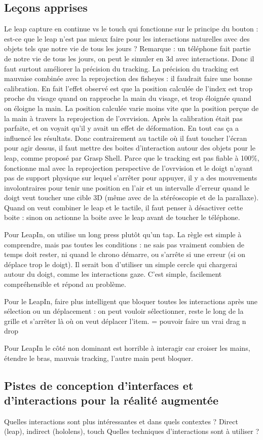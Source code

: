 \subsection{Leçons apprises}
Le leap capture en continue vs le touch qui fonctionne sur le principe du bouton : est-ce que le leap n'est pas mieux faire pour les interactions naturelles avec des objets tels que notre vie de tous les jours ? Remarque : un téléphone fait partie de notre vie de tous les jours, on peut le simuler en 3d avec interactions. Donc il faut surtout améliorer la précision du tracking.
La précision du tracking est mauvaise combinée avec la reprojection des fisheyes : il faudrait faire une bonne calibration. En fait l'effet observé est que la position calculée de l'index est trop proche du visage quand on rapproche la main du visage, et trop éloignée quand on éloigne la main. La position calculée varie moins vite que la position perçue de la main à travers la reprojection de l'ovrvision. Après la calibration était pas parfaite, et on voyait qu'il y avait un effet de déformation. En tout cas ça a influencé les résultats.
Donc contrairement au tactile où il faut toucher l'écran pour agir dessus, il faut mettre des boites d'interaction autour des objets pour le leap, comme proposé par Grasp Shell. Parce que le tracking est pas fiable à 100\%, fonctionne mal avec la reprojection perspective de l'ovrvision et le doigt n'ayant pas de support physique sur lequel s'arrêter pour appuyer, il y a des mouvements involontraires pour tenir une position en l'air et un intervalle d'erreur quand le doigt veut toucher une cible 3D (même avec de la stéréoscopie et de la parallaxe).
Quand on veut combiner le leap et le tactile, il faut penser à désactiver cette boite : sinon on actionne la boite avec le leap avant de toucher le téléphone.

Pour LeapIn, on utilise un long press plutôt qu'un tap. La règle est simple à comprendre, mais pas toutes les conditions : ne sais pas vraiment combien de temps doit rester, ni quand le chrono démarre, ou s'arrête si une erreur (si on déplace trop le doigt). Il serait bon d'utiliser un simple cercle qui chargerai autour du doigt, comme les interactions gaze. C'est simple, facilement compréhensible et répond au problème.

Pour le LeapIn, faire plus intelligent que bloquer toutes les interactions après une sélection ou un déplacement : on peut vouloir sélectionner, reste le long de la grille et s'arrêter là où on veut déplacer l'item. = pouvoir faire un vrai drag n drop

Pour LeapIn le côté non dominant est horrible à interagir car croiser les mains, étendre le bras, mauvais tracking, l'autre main peut bloquer.

\subsection{Pistes de conception d'interfaces et d'interactions pour la réalité augmentée}
Quelles interactions sont plus intéressantes et dans quels contextes ? Direct (leap), indirect (hololens), touch
Quelles techniques d'interactions sont à utiliser ?